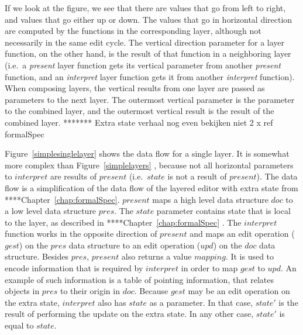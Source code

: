 


\bc
If we look at the figure, we see that there are values that go from left to right, and values that go either up or down. The values that go in horizontal direction are computed by the functions in the corresponding layer, although not necessarily in the same edit cycle. The vertical direction parameter for a layer function, on the other hand, is the result of that function in a neighboring layer (i.e.\ a {\em present} layer function gets its vertical parameter from another {\em present} function, and an {\em interpret} layer function gets it from another {\em interpret} function). When composing layers, the vertical results from one layer are passed as parameters to the next layer. The outermost vertical parameter is the parameter to the combined layer, and the outermost vertical result is the result of the combined layer. 
\ec
\bc
******* Extra state verhaal nog even bekijken  niet 2 x ref formalSpec

Figure~\ref{simplesinglelayer} shows the data flow for a single layer. It is somewhat more complex than Figure~\ref{simplelayers} , because not all horizontal parameters to $interpret$ are results of $present$  (i.e.\ $state$ is not a result of $present$). The data flow is a simplification of the data flow of the layered editor with extra state from ****Chapter~\ref{chap:formalSpec}. $present$ maps a high level data structure $doc$ to a low level data structure $pres$. The $state$ parameter contains state that is local to the layer, as described in ****Chapter~\ref{chap:formalSpec} . The $interpret$ function works in the opposite direction of $present$ and maps an edit operation ($gest$) on the $pres$ data structure to an edit operation ($upd$) on the $doc$ data structure. Besides $pres$, $present$ also returns a value $mapping$. It is used to encode information that is required by $interpret$ in order to map $gest$ to $upd$. An example of such information is a table of pointing information, that relates objects in $pres$ to their origin in $doc$. Because $gest$ may be an edit operation on the extra state, $interpret$ also has $state$ as a parameter. In that case, $state'$ is the result of performing the update on the extra state. In any other case, $state'$ is equal to $state$. 
\ec


